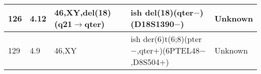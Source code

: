 \begin{table}
\begin{tabular}{ | l  l  l  l  l | }
	126     & 4.12   & 46,XY,del(18)(q21$\rightarrow$qter) & ish del(18)(qter$-$)(D18S1390$-$)                            & Unknown                                                                            \\ \hline
	129     & 4.9    & 46,XY                               & ish der(6)t(6;8)(pter$-$,qter$+$)(6PTEL48$-$,D8S504$+$)      & Unknown                                                                            \\ \hline
\end{tabular}
\end{table}